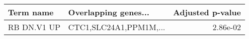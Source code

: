 \begin{tabular}{llr}
\toprule
  Term name &   Overlapping genes... &  Adjusted p-value \\
\midrule
RB DN.V1 UP & CTC1,SLC24A1,PPM1M,... &          2.86e-02 \\
\bottomrule
\end{tabular}
